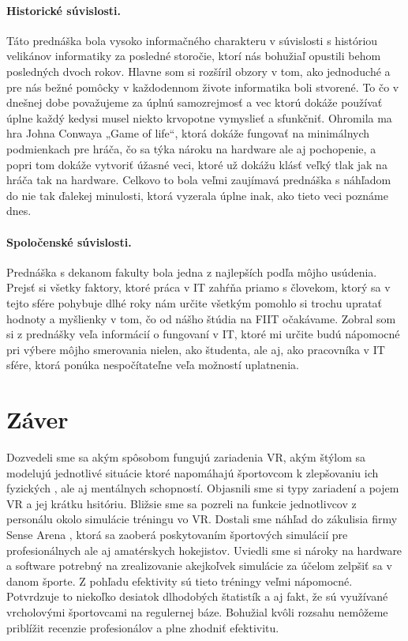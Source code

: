 \documentclass[10pt,twoside,slovak,a4paper]{article}										%
\begin{document}
\paragraph{Historické súvislosti.} 
Táto prednáška bola vysoko informačného charakteru v súvislosti s históriou velikánov informatiky za posledné storočie, ktorí nás bohužiaľ opustili behom posledných dvoch rokov. Hlavne som si rozšíril obzory v tom, ako jednoduché a pre nás bežné pomôcky v každodennom živote informatika boli stvorené. To čo v dnešnej dobe považujeme za úplnú samozrejmosť a vec ktorú dokáže používať úplne každý kedysi musel niekto krvopotne vymyslieť a sfunkčniť. Ohromila ma hra Johna Conwaya „Game of life“, ktorá dokáže fungovať na minimálnych podmienkach pre hráča, čo sa týka nároku na hardware ale aj pochopenie, a popri tom dokáže vytvoriť úžasné veci, ktoré už dokážu klásť veľký tlak jak na hráča tak na hardware. Celkovo to bola veľmi zaujímavá prednáška s náhľadom do nie tak ďalekej minulosti, ktorá vyzerala úplne inak, ako tieto veci poznáme dnes. ~\cite{sedem:zdroj}

\paragraph{Spoločenské súvislosti.} 
Prednáška s dekanom fakulty bola jedna z najlepších podľa môjho usúdenia. Prejsť si všetky faktory, ktoré práca v IT zahŕňa priamo s človekom, ktorý sa v tejto sfére pohybuje dlhé roky nám určite všetkým pomohlo si trochu upratať hodnoty a myšlienky v tom, čo od nášho štúdia na FIIT očakávame. Zobral som si z prednášky veľa informácií o fungovaní v IT, ktoré mi určite budú nápomocné pri výbere môjho smerovania nielen, ako študenta, ale aj, ako pracovníka v IT sfére, ktorá ponúka nespočítateľne veľa možností uplatnenia.~\cite{naco:zdroj}


\section{Záver} \label{zaver}
Dozvedeli sme sa akým spôsobom fungujú zariadenia VR, akým štýlom sa modelujú jednotlivé situácie ktoré napomáhajú športovcom k zlepšovaniu ich fyzických , ale aj mentálnych schopností. Objasnili sme si typy zariadení a pojem VR a jej krátku hsitóriu. Bližsie sme sa pozreli na funkcie jednotlivcov z personálu okolo simulácie tréningu vo VR. Dostali sme náhľad do zákulisia firmy Sense Arena , ktorá sa zaoberá poskytovaním športových simulácií pre profesionálnych ale aj amatérskych hokejistov. Uviedli sme si nároky na hardware a software potrebný na zrealizovanie akejkoľvek simulácie za účelom zelpšiť sa v danom športe. Z pohľadu efektivity sú tieto tréningy veľmi nápomocné. Potvrdzuje to niekoľko desiatok dlhodobých štatistík a aj fakt, že sú využívané vrcholovými športovcami na regulernej báze. Bohužial kvôli rozsahu nemôžeme priblížit recenzie profesionálov a plne zhodniť efektivitu.

 
\end{document}
